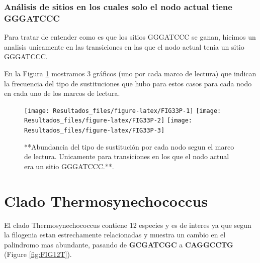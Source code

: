 \documentclass[
]{book}
\begin{document}
\hypertarget{anuxe1lisis-de-sitios-en-los-cuales-solo-el-nodo-actual-tiene-gggatccc}{%
\subsubsection{Análisis de sitios en los cuales solo el nodo actual tiene GGGATCCC}\label{anuxe1lisis-de-sitios-en-los-cuales-solo-el-nodo-actual-tiene-gggatccc}}

Para tratar de entender como es que los sitios GGGATCCC se ganan, hicimos un analisis unicamente en las transiciones en las que el nodo actual tenia un sitio GGGATCCC.

En la Figura \ref{fig:FIG33P} mostramos 3 gráficos (uno por cada marco de lectura) que indican la frecuencia del tipo de sustituciones que hubo para estos casos para cada nodo en cada uno de los marcos de lectura.

\begin{figure}

{\centering \texttt{[image: Resultados\_files/figure-latex/FIG33P-1]} \texttt{[image: Resultados\_files/figure-latex/FIG33P-2]} \texttt{[image: Resultados\_files/figure-latex/FIG33P-3]} 

}

\caption{**Abundancia del tipo de sustitución por cada nodo segun el marco de lectura. Unicamente para transiciones en los que el nodo actual era un sitio GGGATCCC.**.}\label{fig:FIG33P}
\end{figure}

\hypertarget{clado-thermosynechococcus}{%
\section{Clado Thermosynechococcus}\label{clado-thermosynechococcus}}

El clado Thermosynechococcus contiene 12 especies y es de interes ya que segun la filogenia estan estrechamente relacionadas y muestra un cambio en el palindromo mas abundante, pasando de \textbf{GCGATCGC} a \textbf{CAGGCCTG} (Figure \ref{fig:FIG12T}).
\end{document}

